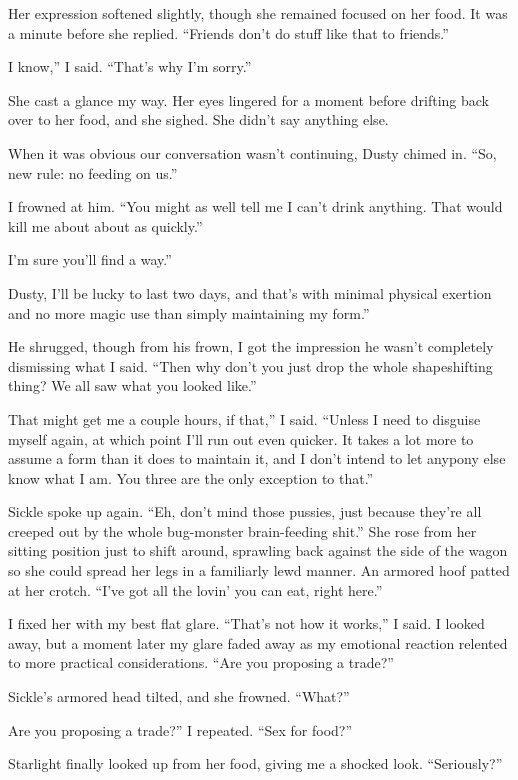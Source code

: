Her expression softened slightly, though she remained focused on her food. It was a minute before she replied. “Friends don’t do stuff like that to friends.”

\leavevmode{}I know,” I said. “That’s why I’m sorry.”

She cast a glance my way. Her eyes lingered for a moment before drifting back over to her food, and she sighed. She didn’t say anything else.

When it was obvious our conversation wasn’t continuing, Dusty chimed in. “So, new rule: no feeding on us.”

I frowned at him. “You might as well tell me I can’t drink anything. That would kill me about about as quickly.”

\leavevmode{}I’m sure you’ll find a way.”

\leavevmode{}Dusty, I’ll be lucky to last two days, and that’s with minimal physical exertion and no more magic use than simply maintaining my form.”

He shrugged, though from his frown, I got the impression he wasn’t completely dismissing what I said. “Then why don’t you just drop the whole shapeshifting thing? We all saw what you looked like.”

\leavevmode{}That might get me a couple hours, if that,” I said. “Unless I need to disguise myself again, at which point I’ll run out even quicker. It takes a lot more to assume a form than it does to maintain it, and I don’t intend to let anypony else know what I am. You three are the only exception to that.”

Sickle spoke up again. “Eh, don’t mind those pussies, just because they’re all creeped out by the whole bug-monster brain-feeding shit.” She rose from her sitting position just to shift around, sprawling back against the side of the wagon so she could spread her legs in a familiarly lewd manner. An armored hoof patted at her crotch. “I’ve got all the lovin’ you can eat, right here.”

I fixed her with my best flat glare. “That’s not how it works,” I said. I looked away, but a moment later my glare faded away as my emotional reaction relented to more practical considerations. “Are you proposing a trade?”

Sickle’s armored head tilted, and she frowned. “What?”

\leavevmode{}Are you proposing a trade?” I repeated. “Sex for food?”

Starlight finally looked up from her food, giving me a shocked look. “Seriously?”

